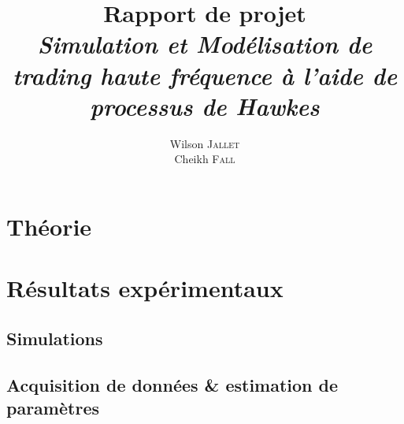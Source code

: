 \documentclass[11pt]{article}
\title{\textbf{Rapport de projet}\\
  \textit{Simulation et Modélisation de trading haute fréquence à l’aide de processus de Hawkes}
}
\author{
  Wilson \textsc{Jallet}\\
  Cheikh \textsc{Fall}
}
\begin{document}
\maketitle

\section{Théorie}

\section{Résultats expérimentaux}

\subsection{Simulations}

\subsection{Acquisition de données \& estimation de paramètres}
\end{document}
